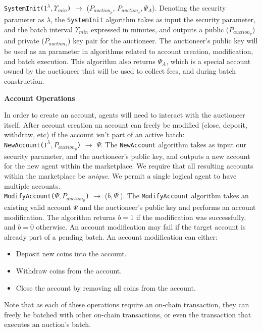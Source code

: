 \documentclass[10pt,a4paper]{article}
\theoremstyle{definition}
\begin{document}
\texttt{SystemInit($1^{\lambda}, \Upsilon_{min}$)} $\rightarrow$ ($P_{auction_p}$,
$P_{auction_s}, \Psi_{A}$). Denoting the security parameter as $\lambda$, the
    \texttt{SystemInit} algorithm takes as input the security parameter, and
    the batch interval $\Upsilon_{min}$ expressed in minutes, and outputs a
    public ($P_{auction_p}$) and private ($P_{auction_s}$) key pair for the
    auctioneer. The auctioneer's public key will be used as an parameter in
    algorithms related to account creation, modification, and batch execution.
    This algorithm also returns $\Psi_{A}$, which is a special account owned by
    the auctioneer that will be used to collect fees, and during batch
    construction.

\begin{center}
    \textbf{Account Operations}
\end{center}

In order to create an account, agents will need to interact with the auctioneer
itself. After account creation an account can freely be modified (close,
deposit, withdraw, etc) if the account isn't part of an active batch: \\

\texttt{NewAccount($1^{\lambda}, P_{auction_p}$)} $\rightarrow$ $\Psi$. The
\texttt{NewAccount} algorithm takes as input our security parameter, and the
auctioneer's public key, and outputs a new account for the new agent within the
marketplace. We require that all resulting accounts within the marketplace be
\emph{unique}. We permit a single logical agent to have multiple accounts. \\

\texttt{ModifyAccount($\Psi, P_{auction_p}$)} $\rightarrow$ ($b, \Psi^\prime$).
The \texttt{ModifyAccount} algorithm takes an existing valid account $\Psi$ and
the auctioneer's public key and performs an account modification. The algorithm
returns $b=1$ if the modification was successfully, and $b=0$ otherwise. An
account modification may fail if the target account is already part of a
pending batch. An account modification can either:
\begin{itemize}
    \item Deposit new coins into the account.
    \item Withdraw coins from the account.
    \item Close the account by removing all coins from the account.
\end{itemize}

Note that as each of these operations require an on-chain transaction, they can
freely be batched with other on-chain transactions, or even the transaction
that executes an auction's batch.
\end{document}
